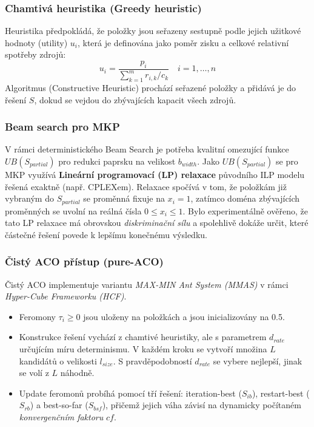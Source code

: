 \documentclass[12pt,a4paper]{article}
\theoremstyle{definition}
\begin{document}
\subsubsection{Chamtivá heuristika (Greedy heuristic)}
Heuristika předpokládá, že položky jsou seřazeny sestupně podle jejich užitkové hodnoty (utility) $u_i$, která je definována jako poměr zisku a celkové relativní spotřeby zdrojů:
\begin{equation}
    u_i = \frac{p_i}{\sum_{k=1}^m r_{i,k} / c_k} \quad i = 1, \dots, n \text{}
\end{equation}
Algoritmus (Constructive Heuristic) prochází seřazené položky a přidává je do řešení $S$, dokud se vejdou do zbývajících kapacit všech zdrojů.

\subsubsection{Beam search pro MKP}
V rámci deterministického Beam Search je potřeba kvalitní omezující funkce $UB(S_{partial})$ pro redukci paprsku na velikost $b_{width}$. 
Jako $UB(S_{partial})$ se pro MKP využívá \textbf{Lineární programovací (LP) relaxace} původního ILP modelu řešená exaktně (např. CPLEXem). 
Relaxace spočívá v tom, že položkám již vybraným do $S_{partial}$ se proměnná fixuje na $x_i = 1$, zatímco doména zbývajících proměnných se uvolní na reálná čísla $0 \le x_i \le 1$. Bylo experimentálně ověřeno, že tato LP relaxace má obrovskou \textit{diskriminační sílu} a spolehlivě dokáže určit, které částečné řešení povede k lepšímu konečnému výsledku.

\subsubsection{Čistý ACO přístup (pure-ACO)}
Čistý ACO implementuje variantu \textit{MAX-MIN Ant System (MMAS)} v rámci \textit{Hyper-Cube Frameworku (HCF)}.
\begin{itemize}
    \item Feromony $\tau_i \ge 0$ jsou uloženy na položkách a jsou inicializovány na 0.5.
    \item Konstrukce řešení vychází z chamtivé heuristiky, ale s parametrem $d_{rate}$ určujícím míru determinismu. V každém kroku se vytvoří množina $L$ kandidátů o velikosti $l_{size}$. S pravděpodobností $d_{rate}$ se vybere nejlepší, jinak se volí z $L$ náhodně. 
    \item Update feromonů probíhá pomocí tří řešení: iteration-best ($S_{ib}$), restart-best ($S_{rb}$) a best-so-far ($S_{bsf}$), přičemž jejich váha závisí na dynamicky počítaném \textit{konvergenčním faktoru} $cf$.
\end{itemize}
\end{document}
